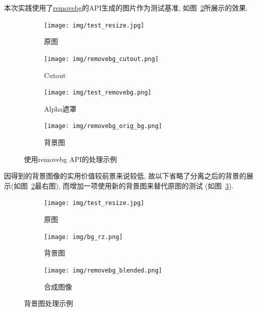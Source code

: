 \documentclass[scheme=chinese,a4paper]{article}
\begin{document}

本次实践使用了\href{https://www.remove.bg/}{removebg}的API生成的图片作为测试基准, 如图~\ref{fig:ideal}所展示的效果. 

\begin{figure}[H]
  \centering
  \begin{subfigure}{0.23\textwidth}
    \centering
    \texttt{[image: img/test\_resize.jpg]}
    \caption{原图}
  \end{subfigure}
  \begin{subfigure}{0.23\textwidth}
    \centering
    \texttt{[image: img/removebg\_cutout.png]}
    \caption{Cutout}
  \end{subfigure}
  \begin{subfigure}{0.23\textwidth}
    \centering
    \texttt{[image: img/test\_removebg.png]}
    \caption{Alpha遮罩}
    \label{fig:alpha_eg}
  \end{subfigure}
  \begin{subfigure}{0.23\textwidth}
    \centering
    \texttt{[image: img/removebg\_orig\_bg.png]}
    \caption{背景图}
  \end{subfigure}

  \caption{使用removebg API的处理示例}
  \label{fig:ideal}
  \end{figure}


因得到的背景图像的实用价值较前景来说较低, 故以下省略了分离之后的背景的展示(如图~\ref{fig:ideal}最右图), 而增加一项使用新的背景图来替代原图的测试 (如图~\ref{fig:blended}). 

\begin{figure}[H]
  \centering
  \begin{subfigure}{0.32\textwidth}
    \centering
    \texttt{[image: img/test\_resize.jpg]}
    \caption{原图}
  \end{subfigure}
  \begin{subfigure}{0.32\textwidth}
    \centering
    \texttt{[image: img/bg\_rz.png]}
    \caption{背景图}
  \end{subfigure}
  \begin{subfigure}{0.32\textwidth}
    \centering
    \texttt{[image: img/removebg\_blended.png]}
    \caption{合成图像}
  \end{subfigure}

  \caption{背景图处理示例}
  \label{fig:blended}
  \end{figure}
\end{document}
